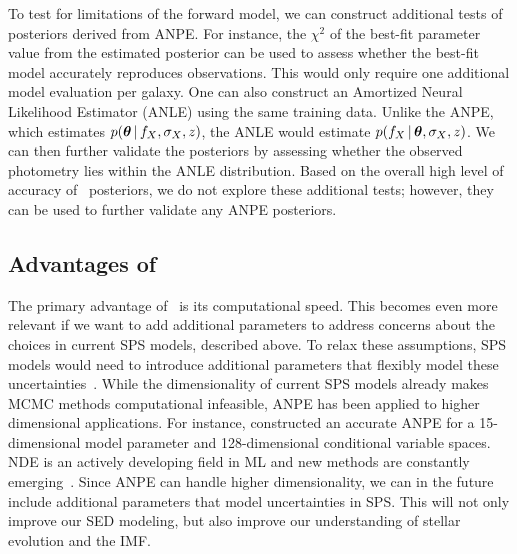 To test for limitations of the forward model, we can construct additional tests
of posteriors derived from ANPE. 
For instance, the $\chi^2$ of the best-fit parameter value from the 
estimated posterior can be used to assess whether the best-fit model 
accurately reproduces observations.
This would only require one additional model evaluation per galaxy. 
One can also construct an Amortized Neural Likelihood Estimator (ANLE) using
the same training data.
Unlike the ANPE, which estimates $p(\boldsymbol{\theta}\,|\, f_X, \sigma_X, z)$, the ANLE
would estimate $p(f_X \,|\, \boldsymbol{\theta}, \sigma_X, z)$.
We can then further validate the posteriors by assessing whether the observed
photometry lies within the ANLE distribution. 
Based on the overall high level of accuracy of \sedflow~posteriors, we do not
explore these additional tests; however, they can be used to further validate
any ANPE posteriors. 

\subsection{Advantages of \sedflow} 
The primary advantage of \sedflow~is its computational speed. 
This becomes even more relevant if we want to add additional parameters to
address concerns about the choices in current SPS models, described above.
To relax these assumptions, SPS models would need to introduce additional
parameters that flexibly model these uncertainties~\citep{conroy2009,
conroy2010c}. 
While the dimensionality of current SPS models already makes MCMC methods
computational infeasible, ANPE has been applied to higher dimensional
applications.
For instance, \cite{dax2021} constructed an accurate ANPE for a
15-dimensional model parameter and 128-dimensional conditional variable
spaces.
NDE is an actively developing field in ML and new methods are constantly
emerging~\citep[\eg][]{wu2020, dhariwal2021}. 
Since ANPE can handle higher dimensionality, we can in the future include
additional parameters that model uncertainties in SPS. 
This will not only improve our SED modeling, but also improve our understanding
of stellar evolution and the IMF.

